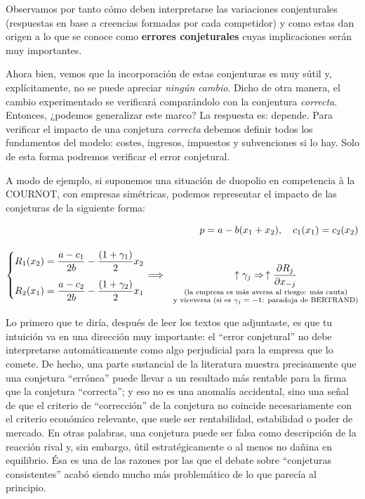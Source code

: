 \documentclass[10pt,a4paper]{article}
\begin{document}
Observamos por tanto cómo deben interpretarse las variaciones conjenturales (respuestas en base a creencias formadas por cada competidor) y como estas dan origen a lo que se conoce como \textbf{errores conjeturales} cuyas implicaciones serán muy importantes.

Ahora bien, vemos que la incorporación de estas conjenturas es muy sútil y, explícitamente, no se puede apreciar \textit{ningún cambio}. Dicho de otra manera, el cambio experimentado se verificará comparándolo con la conjentura \textit{correcta}. Entonces, ¿podemos generalizar este marco? La respuesta es: depende. Para verificar el impacto de una conjetura \textit{correcta} debemos definir todos los fundamentos del modelo: costes, ingresos, impuestos y subvenciones si lo hay. Solo de esta forma podremos verificar el error conjetural. 

A modo de ejemplo, si suponemos una situación de duopolio en competencia à la COURNOT, con empresas simétricas, podemos representar el impacto de las conjeturas de la siguiente forma:

$$\begin{aligned}
    p=a-b(x_1+x_2),\quad c_1(x_1)=c_2(x_2)\\[1em]
    \left\{\begin{aligned}
        R_1(x_2)=\frac{a-c_1}{2b}-\frac{(1+\gamma_1)}{2}x_2\\[0.5em]
        R_2(x_1)=\frac{a-c_2}{2b}-\frac{(1+\gamma_2)}{2}x_1
    \end{aligned}\right.\Longrightarrow
    \quad \underset{\substack{\text{\scriptsize (la empresa es más aversa al riesgo: más cauta)}\\\text{\scriptsize y viceversa (si es $\gamma_j=-1$: paradoja de BERTRAND)}}}{\uparrow\gamma_j\Rightarrow\,\uparrow \frac{\partial R_j }{\partial x_{-j}}}
\end{aligned}$$

Lo primero que te diría, después de leer los textos que adjuntaste, es que tu intuición va en una dirección muy importante: el “error conjetural” no debe interpretarse automáticamente como algo perjudicial para la empresa que lo comete. De hecho, una parte sustancial de la literatura muestra precisamente que una conjetura “errónea” puede llevar a un resultado más rentable para la firma que la conjetura “correcta”; y eso no es una anomalía accidental, sino una señal de que el criterio de “corrección” de la conjetura no coincide necesariamente con el criterio económico relevante, que suele ser rentabilidad, estabilidad o poder de mercado. En otras palabras, una conjetura puede ser falsa como descripción de la reacción rival y, sin embargo, útil estratégicamente o al menos no dañina en equilibrio. Ésa es una de las razones por las que el debate sobre “conjeturas consistentes” acabó siendo mucho más problemático de lo que parecía al principio. 
\end{document}
